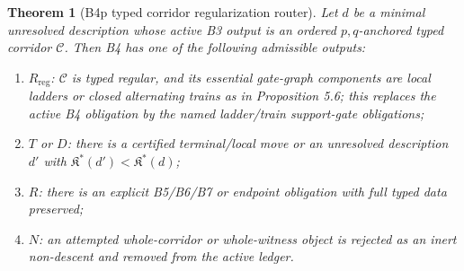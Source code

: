 \documentclass[11pt]{amsart}
\newtheorem{theorem}{Theorem}[section]
\theoremstyle{definition}
\begin{document}
\begin{theorem}[B4p typed corridor regularization router]
Let \(d\) be a minimal unresolved description whose active B3 output is an ordered \(p,q\)-anchored typed corridor \(\mathcal C\). Then B4 has one of the following admissible outputs:

\begin{enumerate}
\item \(R_{\mathrm{reg}}\): \(\mathcal C\) is typed regular, and its essential gate-graph components are local ladders or closed alternating trains as in Proposition 5.6; this replaces the active B4 obligation by the named ladder/train support-gate obligations;
\item \(T\) or \(D\): there is a certified terminal/local move or an unresolved description \(d'\) with \(\mathfrak K^\ast(d')<\mathfrak K^\ast(d)\);
\item \(R\): there is an explicit B5/B6/B7 or endpoint obligation with full typed data preserved;
\item \(N\): an attempted whole-corridor or whole-witness object is rejected as an inert non-descent and removed from the active ledger.
\end{enumerate}

\end{theorem}
\end{document}
